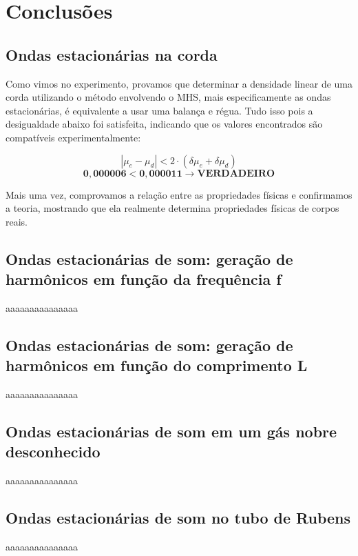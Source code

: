 \newpage
\section{Conclusões}

\subsection{Ondas estacionárias na corda}

Como vimos no experimento, provamos que determinar a densidade linear de uma corda utilizando o método envolvendo o MHS, mais especificamente as ondas estacionárias, é equivalente a usar uma balança e régua. Tudo isso pois a desigualdade abaixo foi satisfeita, indicando que os valores encontrados são compatíveis experimentalmente:

\[ |\mu_e - \mu_d| < 2 \cdot (\delta \mu_e + \delta \mu_d) \]
\[ \mathbf{0,000006 < 0,000011 \xrightarrow{} VERDADEIRO} \]

Mais uma vez, comprovamos a relação entre as propriedades físicas e confirmamos a teoria, mostrando que ela realmente determina propriedades físicas de corpos reais.

\subsection{Ondas estacionárias de som: geração de harmônicos
em função da frequência f}

aaaaaaaaaaaaaaa

\subsection{Ondas estacionárias de som: geração de harmônicos em
função do comprimento L}

aaaaaaaaaaaaaaa

\subsection{Ondas estacionárias de som em um gás nobre
desconhecido}

aaaaaaaaaaaaaaa

\subsection{Ondas estacionárias de som no tubo de Rubens}

aaaaaaaaaaaaaaa
